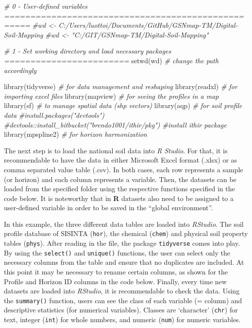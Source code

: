 \documentclass[
  10pt,
  b5paper,
  oneside]{book}
\newenvironment{Shaded}{\begin{snugshade}}{\end{snugshade}}
\newcommand{\CommentTok}[1]{\textcolor[rgb]{0.56,0.35,0.01}{\textit{#1}}}
\newcommand{\FunctionTok}[1]{\textcolor[rgb]{0.00,0.00,0.00}{#1}}
\newcommand{\NormalTok}[1]{#1}
\begin{document}
\begin{Shaded}
\begin{Highlighting}[]
\CommentTok{\# 0 {-} User{-}defined variables ===================================================}
\CommentTok{\#wd \textless{}{-} \textquotesingle{}C:/Users/luottoi/Documents/GitHub/GSNmap{-}TM/Digital{-}Soil{-}Mapping\textquotesingle{}}
\CommentTok{\#wd \textless{}{-} "C:/GIT/GSNmap{-}TM/Digital{-}Soil{-}Mapping"}

\CommentTok{\# 1 {-} Set working directory and load necessary packages ========================}
\FunctionTok{setwd}\NormalTok{(wd) }\CommentTok{\# change the path accordingly}

\FunctionTok{library}\NormalTok{(tidyverse) }\CommentTok{\# for data management and reshaping}
\FunctionTok{library}\NormalTok{(readxl) }\CommentTok{\# for importing excel files}
\FunctionTok{library}\NormalTok{(mapview) }\CommentTok{\# for seeing the profiles in a map}
\FunctionTok{library}\NormalTok{(sf) }\CommentTok{\# to manage spatial data (shp vectors) }
\FunctionTok{library}\NormalTok{(aqp) }\CommentTok{\# for soil profile data}
\CommentTok{\#install.packages("devtools") }
\CommentTok{\#devtools::install\_bitbucket("brendo1001/ithir/pkg") \#install ithir package}
\FunctionTok{library}\NormalTok{(mpspline2) }\CommentTok{\# for horizon harmonization}
\end{Highlighting}
\end{Shaded}

The next step is to load the national soil data into \emph{R Studio}. For that, it is recommendable to have the data in either Microsoft Excel format (.xlsx) or as comma separated value table (.csv). In both cases, each row represents a sample (or horizon) and each column represents a variable. Then, the datasets can be loaded from the specified folder using the respective functions specified in the code below. It is noteworthy that in \textbf{R} datasets also need to be assigned to a user-defined variable in order to be saved in the ``global environment''.

In this example, the three different data tables are loaded into \emph{RStudio}. The soil profile database of SISINTA (\texttt{hor}), the chemical (\texttt{chem}) and physical soil property tables (\texttt{phys}). After reading in the file, the package \texttt{tidyverse} comes into play. By using the \texttt{select()} and \texttt{unique()} functions, the user can select only the necessary columns from the table and ensure that no duplicates are included. At this point it may be necessary to rename certain columns, as shown for the Profile and Horizon ID columns in the code below.
Finally, every time new datasets are loaded into \emph{RStudio}, it is recommendable to check the data. Using the \texttt{summary()} function, users can see the class of each variable (= column) and descriptive statistics (for numerical variables). Classes are `character' (\texttt{chr}) for text, integer (\texttt{int}) for whole numbers, and numeric (\texttt{num}) for numeric variables.
\end{document}
